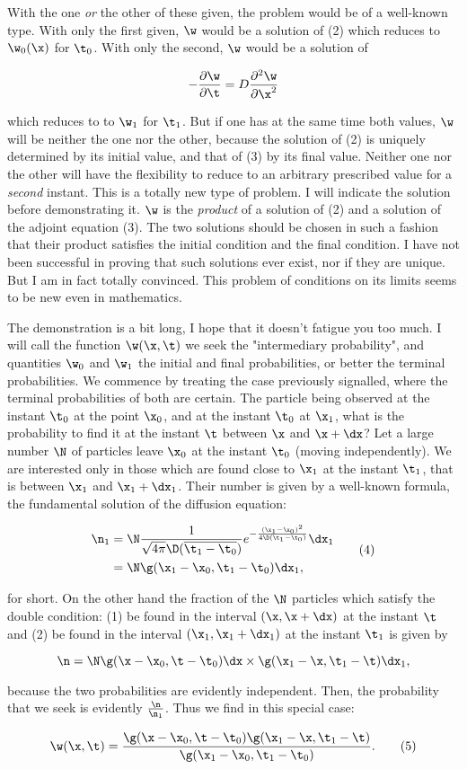 \documentclass{article}
\newcommand{\nequ}[2]{
\begin{equation*}
#1
\tag{#2}
\end{equation*}
}
\newcommand{\uequ}[1]{
\begin{equation*}
#1
\end{equation*}
}
\newcommand{\var}[1]{#1}
\newcommand{\const}[1]{#1}
\newcommand{\inv}[1]{\frac{1}{#1}}
\newcommand{\pddt}[1]{\pdXdY{#1}{\t}}
\newcommand{\pdXdY}[2]{
\frac{\partial {#1}}{\partial {#2}}
}
\newcommand{\pddXdYY}[2]{
\frac{\partial^2 {#1}}{\partial {#2}^2}
}
\newcommand{\barred}[1]{
\overline{#1}
}
\renewcommand{\it}[1]{\textit{#1}}
\renewcommand{\exp}[1]{\const{e}^{#1}}
\begin{document}
With the one \it{or} the other of these given, the problem would be of a well-known type. With only the first given, $\w$ would be a solution of (2) which reduces to $\w_0(\x)$ for $\t_0$. With only the second, $\w$ would be a solution of
\uequ{
-\pddt{\w} = \var{D}\pddXdYY{\w}{\x}
}
which reduces to to $\w_1$ for $\t_1$. But if one has at the same time both values, $\w$ will be neither the one nor the other, because the solution of (2) is uniquely determined by its initial value, and that of (3) by its final value. Neither one nor the other will have the flexibility to reduce to an arbitrary prescribed value for a \it{second} instant. This is a totally new type of problem. I will indicate the solution before demonstrating it. $\w$ is the \it{product} of a solution of (2) and a solution of the adjoint equation (3). The two solutions should be chosen in such a fashion that their product satisfies the initial condition and the final condition. I have not been successful in proving that such solutions ever exist, nor if they are unique. But I am in fact totally convinced. This problem of conditions on its limits seems to be new even in mathematics.

The demonstration is a bit long, I hope that it doesn't fatigue you too much. I will call the function $\w(\x, \t)$ we seek the "intermediary probability", and quantities $\w_0$ and $\w_1$ the initial and final probabilities, or better the terminal probabilities. We commence by treating the case previously signalled, where the terminal probabilities of both are certain. The particle being observed at the instant $\t_0$ at the point $\x_0$, and at the instant $\t_0$ at $\x_1$, what is the probability to find it at the instant $\t$ between $\x$ and $\x + \dx$? Let a large number $\N$ of particles leave $\x_0$ at the instant $\t_0$ (moving independently). We are interested only in those which are found close to $\x_1$ at the instant $\t_1$, that is between $\x_1$ and $\x_1+\dx_1$. Their number is given by a well-known formula, the fundamental solution of the diffusion equation:
\nequ{
\begin{split}
\n_1 &= \N\inv{\sqrt{4\pi}\D(\barred{\t_1-\t_0})}
\exp{-\frac{(\x_1-\x_0)^2}{4\D(\t_1-\t_0)}}
\dx_1 \\
 &= \N\g(\x_1 - \x_0, \t_1-\t_0)\dx_1,
\end{split}
}{4}
for short. On the other hand the fraction of the $\N$ particles which satisfy the double condition: (1) be found in the interval $(\x, \x+\dx)$ at the instant $\t$ and (2) be found in the interval $(\x_1, \x_1+\dx_1)$ at the instant $\t_1$ is given by
\uequ{
\n = \N\g(\x-\x_0, \t-\t_0)\dx\times\g(\x_1-\x, \t_1-\t)\dx_1,
}
because the two probabilities are evidently independent. Then, the probability that we seek is evidently $\frac{\n}{\n_1}$. Thus we find in this special case:
\nequ{
\w(\x, \t) = \frac{\g(\x-\x_0,\t-\t_0)\g(\x_1-\x,\t_1-\t)}{\g(\x_1-\x_0, \t_1-\t_0)}.
}{5}
\end{document}
